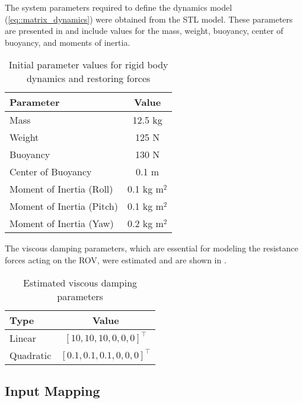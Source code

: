    The system parameters required to define the dynamics model (\ref{eq::matrix_dynamics}) were obtained from the STL model. These parameters are presented in  and include values for the mass, weight, buoyancy, center of buoyancy, and moments of inertia.

    \begin{table}[h]
    \captionsetup{justification=centering}
    \caption{Initial parameter values for rigid body dynamics and restoring forces}
    \begin{center}
    \begin{tabular}{|l|c|}
        \hline
        \textbf{Parameter} & \textbf{Value} \\ \hline
        Mass & 12.5 kg \\ \hline
        Weight & 125 N \\ \hline
        Buoyancy & 130 N \\ \hline
        Center of Buoyancy & 0.1 m \\ \hline
        Moment of Inertia (Roll) & 0.1 kg m$^2$ \\ \hline
        Moment of Inertia (Pitch) & 0.1 kg m$^2$ \\ \hline
        Moment of Inertia (Yaw) & 0.2 kg m$^2$ \\ \hline
    \end{tabular}
    \end{center}
    \label{tab::rov}
    \end{table}

    The viscous damping parameters, which are essential for modeling the resistance forces acting on the ROV, were estimated and are shown in . 
    \begin{table}[h]
    \captionsetup{justification=centering}
    \caption{Estimated viscous damping parameters}
    \begin{center}
    \begin{tabular}{|l|c|}
    \hline
    \textbf{Type} & \textbf{Value} \\ \hline
    Linear & $[10, 10, 10, 0, 0, 0]^\top$ \\
    Quadratic & $[0.1, 0.1, 0.1, 0, 0, 0]^\top$ \\ \hline
    \end{tabular}
    \end{center}
    \label{tab::damping}
    \end{table}

\subsection{Input Mapping}

